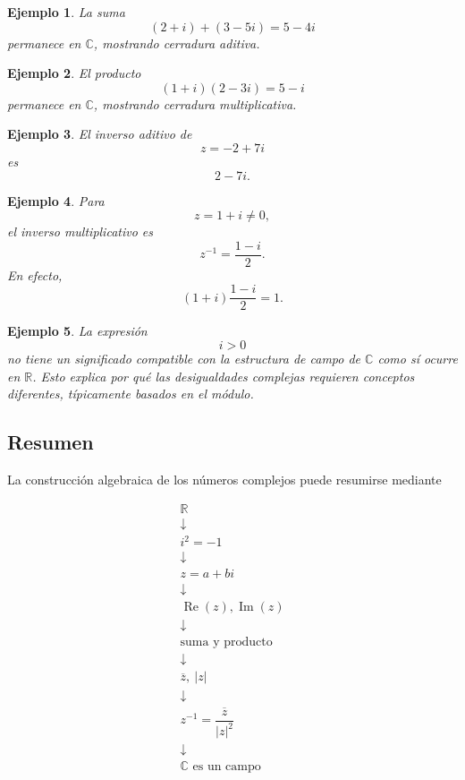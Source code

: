 \documentclass[12pt]{article}
\newtheorem{Ejem}{Ejemplo}
\begin{document}
\begin{Ejem} La suma
\[
(2+i)+(3-5i)=5-4i
\]
permanece en $\mathbb{C}$, mostrando cerradura aditiva.
\end{Ejem}

\begin{Ejem} 
El producto
\[
(1+i)(2-3i)=5-i
\]
permanece en $\mathbb{C}$, mostrando cerradura multiplicativa.

\end{Ejem}

\begin{Ejem} El inverso aditivo de
\[
z=-2+7i
\]
es
\[
2-7i.
\]

\end{Ejem}

\begin{Ejem} Para
\[
z=1+i\neq0,
\]
el inverso multiplicativo es
\[
z^{-1}
=
\frac{1-i}{2}.
\]
En efecto,
\[
(1+i)\frac{1-i}{2}
=
1.
\]

\end{Ejem}

\begin{Ejem} La expresión
\[
i>0
\]
no tiene un significado compatible con la estructura de campo de
$\mathbb{C}$ como sí ocurre en $\mathbb{R}$. Esto explica por qué las
desigualdades complejas requieren conceptos diferentes, típicamente
basados en el módulo.
\end{Ejem}


\subsection*{Resumen}

La construcción algebraica de los números complejos puede resumirse mediante

\[
\boxed{
\begin{array}{c}
\mathbb{R}
\\[0.2cm]
\downarrow
\\[0.2cm]
i^2=-1
\\[0.2cm]
\downarrow
\\[0.2cm]
z=a+bi
\\[0.2cm]
\downarrow
\\[0.2cm]
\operatorname{Re}(z),\operatorname{Im}(z)
\\[0.2cm]
\downarrow
\\[0.2cm]
\text{suma y producto}
\\[0.2cm]
\downarrow
\\[0.2cm]
\overline z,\ |z|
\\[0.2cm]
\downarrow
\\[0.2cm]
z^{-1}=\dfrac{\overline z}{|z|^2}
\\[0.2cm]
\downarrow
\\[0.2cm]
\mathbb{C}\text{ es un campo}
\end{array}
}
\]
\end{document}
